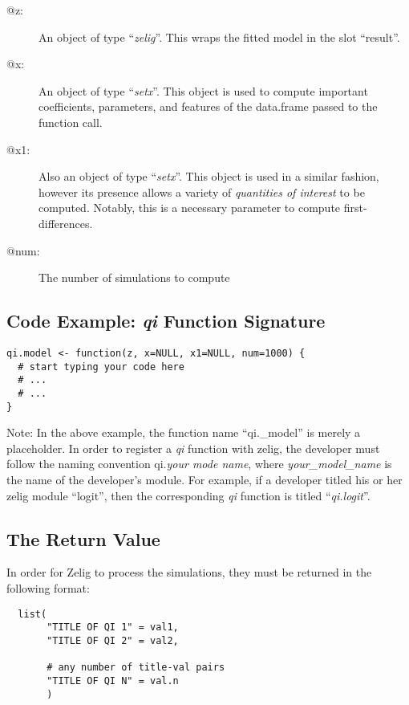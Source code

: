 \documentclass[11pt]{article}
\begin{document}
%
%
\begin{description}
	\item[@z:]{An object of type ``\emph{zelig}''.  This wraps the fitted model in the slot ``result''.}
	\item[@x:]{An object of type ``\emph{setx}''.  This object is used to compute important coefficients, parameters, and features of the data.frame passed to the function call.}
	\item[@x1:]{Also an object of type ``\emph{setx}''.  This object is used in a similar fashion, however its presence allows a variety of \emph{quantities of interest} to be computed.  Notably, this is a necessary parameter to compute first-differences.}
	\item[@num:]{The number of simulations to compute}
\end{description}


%
\subsection{Code Example: \emph{qi} Function Signature}
\begin{verbatim}
qi.model <- function(z, x=NULL, x1=NULL, num=1000) {
  # start typing your code here
  # ...
  # ...
}
\end{verbatim}


Note: In the above example, the function name ``qi.\_model'' is merely a placeholder.  In order to register a \emph{qi} function with zelig, the developer must follow the naming convention qi.\emph{your mode name}, where \emph{your\_model\_name} is the name of the developer's module.  For example, if a developer titled his or her zelig module ``logit'', then the corresponding \emph{qi} function is titled ``\emph{qi.logit}''.


\pagebreak

\subsection{The Return Value}
In order for Zelig to process the simulations, they must be returned in the following format:

\begin{verbatim}
  list(
       "TITLE OF QI 1" = val1,
       "TITLE OF QI 2" = val2,

       # any number of title-val pairs
       "TITLE OF QI N" = val.n
       )
\end{verbatim}
\end{document}
